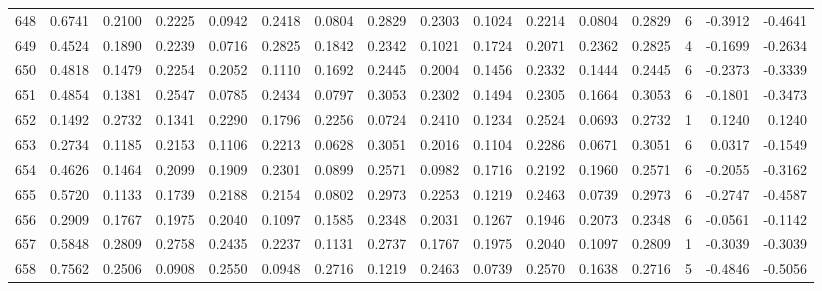\begin{tabular}{lrrrrrrrrrrrrrrr}
648 &      0.6741 &  0.2100 &  0.2225 &  0.0942 &  0.2418 &  0.0804 &  0.2829 &  0.2303 &  0.1024 &  0.2214 &   0.0804 &     0.2829 &      6 &                   -0.3912 &                    -0.4641 \\
649 &      0.4524 &  0.1890 &  0.2239 &  0.0716 &  0.2825 &  0.1842 &  0.2342 &  0.1021 &  0.1724 &  0.2071 &   0.2362 &     0.2825 &      4 &                   -0.1699 &                    -0.2634 \\
650 &      0.4818 &  0.1479 &  0.2254 &  0.2052 &  0.1110 &  0.1692 &  0.2445 &  0.2004 &  0.1456 &  0.2332 &   0.1444 &     0.2445 &      6 &                   -0.2373 &                    -0.3339 \\
651 &      0.4854 &  0.1381 &  0.2547 &  0.0785 &  0.2434 &  0.0797 &  0.3053 &  0.2302 &  0.1494 &  0.2305 &   0.1664 &     0.3053 &      6 &                   -0.1801 &                    -0.3473 \\
652 &      0.1492 &  0.2732 &  0.1341 &  0.2290 &  0.1796 &  0.2256 &  0.0724 &  0.2410 &  0.1234 &  0.2524 &   0.0693 &     0.2732 &      1 &                    0.1240 &                     0.1240 \\
653 &      0.2734 &  0.1185 &  0.2153 &  0.1106 &  0.2213 &  0.0628 &  0.3051 &  0.2016 &  0.1104 &  0.2286 &   0.0671 &     0.3051 &      6 &                    0.0317 &                    -0.1549 \\
654 &      0.4626 &  0.1464 &  0.2099 &  0.1909 &  0.2301 &  0.0899 &  0.2571 &  0.0982 &  0.1716 &  0.2192 &   0.1960 &     0.2571 &      6 &                   -0.2055 &                    -0.3162 \\
655 &      0.5720 &  0.1133 &  0.1739 &  0.2188 &  0.2154 &  0.0802 &  0.2973 &  0.2253 &  0.1219 &  0.2463 &   0.0739 &     0.2973 &      6 &                   -0.2747 &                    -0.4587 \\
656 &      0.2909 &  0.1767 &  0.1975 &  0.2040 &  0.1097 &  0.1585 &  0.2348 &  0.2031 &  0.1267 &  0.1946 &   0.2073 &     0.2348 &      6 &                   -0.0561 &                    -0.1142 \\
657 &      0.5848 &  0.2809 &  0.2758 &  0.2435 &  0.2237 &  0.1131 &  0.2737 &  0.1767 &  0.1975 &  0.2040 &   0.1097 &     0.2809 &      1 &                   -0.3039 &                    -0.3039 \\
658 &      0.7562 &  0.2506 &  0.0908 &  0.2550 &  0.0948 &  0.2716 &  0.1219 &  0.2463 &  0.0739 &  0.2570 &   0.1638 &     0.2716 &      5 &                   -0.4846 &                    -0.5056 \\

\end{tabular}
